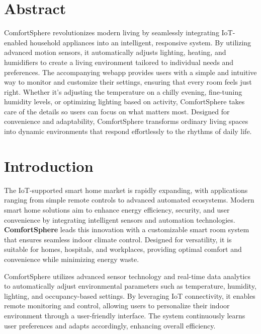 \documentclass[a4paper]{scrartcl}
\title{\paperTitle}
\author{
    Juhi Joshi~<jr.joshi@stud.fh-sm.de>, 316800\\
    Amardeep Mishra~<a.mishra@stud.fh-sm.de>, 316652\\
    Hardikkumar Savaliya~<hv.savaliya@stud.fh-sm.de>, 313904\\
    Mohammad Sheikh~<mzi.sheikh@stud.fh-sm.de>, 312538\\
    Hammad Chaudhary<rehman@stud.fh-sm.de>, 313955
    }
\date{}
\begin{document}
	\maketitle
	
 	\section{Abstract}
		{ComfortSphere revolutionizes modern living by seamlessly integrating IoT-enabled household appliances into an intelligent, responsive system. By utilizing advanced motion sensors, it automatically adjusts lighting, heating, and humidifiers to create a living environment tailored to individual needs and preferences. The accompanying webapp provides users with a simple and intuitive way to monitor and customize their settings, ensuring that every room feels just right. Whether it's adjusting the temperature on a chilly evening, fine-tuning humidity levels, or optimizing lighting based on activity, ComfortSphere takes care of the details so users can focus on what matters most. Designed for convenience and adaptability, ComfortSphere transforms ordinary living spaces into dynamic environments that respond effortlessly to the rhythms of daily life.}

	\section{Introduction}
\label{sec:intro}

The IoT-supported smart home market is rapidly expanding, with applications ranging from simple remote controls to advanced automated ecosystems. Modern smart home solutions aim to enhance energy efficiency, security, and user convenience by integrating intelligent sensors and automation technologies. \textbf{ComfortSphere} leads this innovation with a customizable smart room system that ensures seamless indoor climate control. Designed for versatility, it is suitable for homes, hospitals, and workplaces, providing optimal comfort and convenience while minimizing energy waste.

ComfortSphere utilizes advanced sensor technology and real-time data analytics to automatically adjust environmental parameters such as temperature, humidity, lighting, and occupancy-based settings. By leveraging IoT connectivity, it enables remote monitoring and control, allowing users to personalize their indoor environment through a user-friendly interface. The system continuously learns user preferences and adapts accordingly, enhancing overall efficiency.
\end{document}
